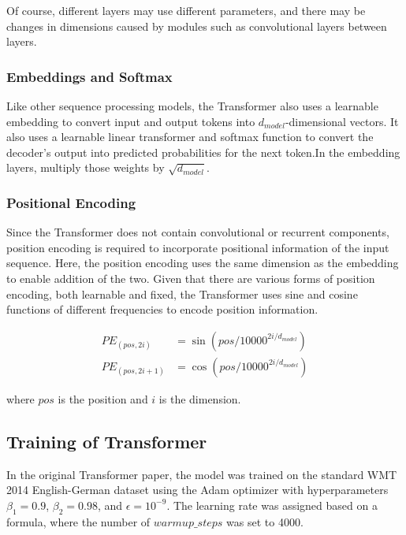 \documentclass{IEEEtran}
\begin{document}
\par Of course, different layers may use different parameters, and there may be changes 
in dimensions caused by modules such as convolutional layers between layers.

\subsubsection{Embeddings and Softmax}

\par Like other sequence processing models, the Transformer also uses a learnable 
embedding to convert input and output tokens into $d_{model}$-dimensional vectors. It also 
uses a learnable linear transformer and softmax function to convert the decoder's output 
into predicted probabilities for the next token.In the embedding layers, 
multiply those weights by $\sqrt{d_{model}}$.

\subsubsection{Positional Encoding}

\par Since the Transformer does not contain convolutional or recurrent components, 
position encoding is required to incorporate positional information of the input sequence. 
Here, the position encoding uses the same dimension as the embedding to enable addition of the two. 
Given that there are various forms of position encoding, both learnable and fixed, 
the Transformer uses sine and cosine functions of different frequencies to encode position information.

\begin{align*}
    PE_{(pos,2i)} &= \sin(pos/10000^{2i/d_{model}})\\
    PE_{(pos,2i+1)} &= \cos(pos/10000^{2i/d_{model}})
\end{align*}

\par where $pos$ is the position and $i$ is the dimension.


\subsection{Training of Transformer}
\par In the original Transformer paper, the model was trained on the standard WMT 2014 English-German 
dataset using the Adam optimizer with hyperparameters $\beta_1 = 0.9$, $\beta_2 = 0.98$, and 
$ \epsilon = 10^{-9}$. The learning rate was assigned based on a formula, where the number 
of $warmup\_steps$ was set to 4000.
\end{document}
